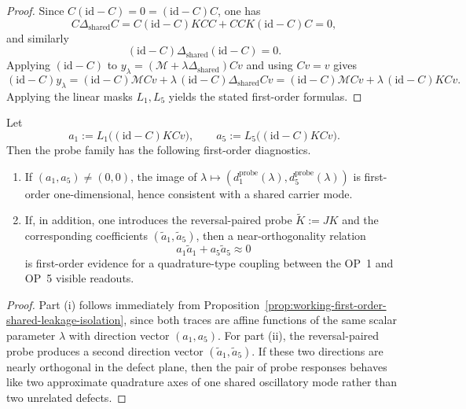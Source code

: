 \begin{proof}
Since \(C(\mathrm{id}-C)=0=(\mathrm{id}-C)C\), one has
\[
 C\Delta_{\mathrm{shared}}C
 = C(\mathrm{id}-C)KC C + CCK(\mathrm{id}-C)C = 0,
\]
and similarly
\[
 (\mathrm{id}-C)\Delta_{\mathrm{shared}}(\mathrm{id}-C)=0.
\]
Applying \((\mathrm{id}-C)\) to
\(y_\lambda=(\mathcal M+\lambda\Delta_{\mathrm{shared}})Cv\)
and using \(Cv=v\) gives
\[
 (\mathrm{id}-C)y_\lambda
 = (\mathrm{id}-C)\mathcal M C v + \lambda\,(\mathrm{id}-C)\Delta_{\mathrm{shared}} C v
 = (\mathrm{id}-C)\mathcal M C v + \lambda\,(\mathrm{id}-C)KC v.
\]
Applying the linear masks \(L_1,L_5\) yields the stated first-order formulas.
\end{proof}

\begin{proposition}
\label{prop:working-concrete-probe-family-tests}
Let
\[
 a_1:=L_1\bigl((\mathrm{id}-C)KC v\bigr),
 \qquad
 a_5:=L_5\bigl((\mathrm{id}-C)KC v\bigr).
\]
Then the probe family has the following first-order diagnostics.
\begin{enumerate}[label=(\roman*), leftmargin=2em]
 \item If \((a_1,a_5)\neq (0,0)\), the image of
 \(\lambda\mapsto (d^{\mathrm{probe}}_1(\lambda),d^{\mathrm{probe}}_5(\lambda))\)
 is first-order one-dimensional, hence consistent with a shared carrier mode.
 \item If, in addition, one introduces the reversal-paired probe
 \(\widetilde K:=JK\) and the corresponding coefficients
 \((\tilde a_1,\tilde a_5)\), then a near-orthogonality relation
 \[
 a_1\tilde a_1 + a_5\tilde a_5 \approx 0
 \]
 is first-order evidence for a quadrature-type coupling between the OP~1 and OP~5 visible readouts.
\end{enumerate}
\end{proposition}

\begin{proof}
Part (i) follows immediately from Proposition~\ref{prop:working-first-order-shared-leakage-isolation}, since both traces are affine functions of the same scalar parameter \(\lambda\) with direction vector \((a_1,a_5)\). For part (ii), the reversal-paired probe produces a second direction vector \((\tilde a_1,\tilde a_5)\). If these two directions are nearly orthogonal in the defect plane, then the pair of probe responses behaves like two approximate quadrature axes of one shared oscillatory mode rather than two unrelated defects.
\end{proof}


